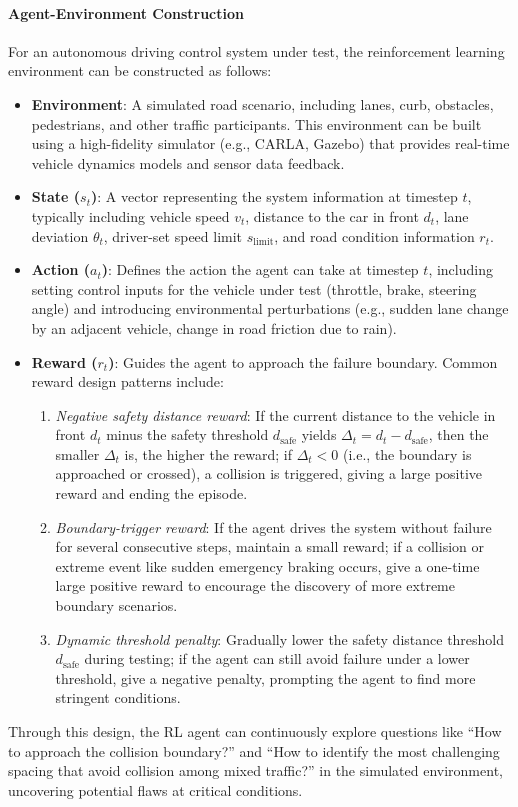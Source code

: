 \documentclass[manuscript,screen,review]{acmart}
\begin{document}
\paragraph{Agent-Environment Construction}  
For an autonomous driving control system under test, the reinforcement learning environment can be constructed as follows:
\begin{itemize}
  \item \textbf{Environment}: A simulated road scenario, including lanes, curb, obstacles, pedestrians, and other traffic participants. This environment can be built using a high-fidelity simulator (e.g., CARLA, Gazebo) that provides real-time vehicle dynamics models and sensor data feedback.
  \item \textbf{State ($s_t$)}: A vector representing the system information at timestep $t$, typically including vehicle speed $v_t$, distance to the car in front $d_t$, lane deviation $\theta_t$, driver-set speed limit $s_{\mathrm{limit}}$, and road condition information $r_t$.
  \item \textbf{Action ($a_t$)}: Defines the action the agent can take at timestep $t$, including setting control inputs for the vehicle under test (throttle, brake, steering angle) and introducing environmental perturbations (e.g., sudden lane change by an adjacent vehicle, change in road friction due to rain).
  \item \textbf{Reward ($r_t$)}: Guides the agent to approach the failure boundary. Common reward design patterns include:
    \begin{enumerate}
      \item \emph{Negative safety distance reward}: If the current distance to the vehicle in front $d_t$ minus the safety threshold $d_{\mathrm{safe}}$ yields $\Delta_t = d_t - d_{\mathrm{safe}}$, then the smaller $\Delta_t$ is, the higher the reward; if $\Delta_t < 0$ (i.e., the boundary is approached or crossed), a collision is triggered, giving a large positive reward and ending the episode.
      \item \emph{Boundary-trigger reward}: If the agent drives the system without failure for several consecutive steps, maintain a small reward; if a collision or extreme event like sudden emergency braking occurs, give a one-time large positive reward to encourage the discovery of more extreme boundary scenarios.
      \item \emph{Dynamic threshold penalty}: Gradually lower the safety distance threshold $d_{\mathrm{safe}}$ during testing; if the agent can still avoid failure under a lower threshold, give a negative penalty, prompting the agent to find more stringent conditions.
    \end{enumerate}
\end{itemize}
Through this design, the RL agent can continuously explore questions like ``How to approach the collision boundary?'' and ``How to identify the most challenging spacing that avoid collision among mixed traffic?'' in the simulated environment, uncovering potential flaws at critical conditions.
\end{document}
